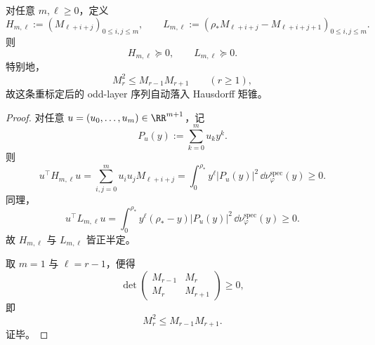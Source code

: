 \begin{corollary}\label{cor:xi-time-part9zbj-shifted-spectral-zeta-hankel-localizing}
对任意 \(m,\ell\ge 0\)，定义
\[
H_{m,\ell}:=(M_{\ell+i+j})_{0\le i,j\le m},
\qquad
L_{m,\ell}:=(\rho_\ast M_{\ell+i+j}-M_{\ell+i+j+1})_{0\le i,j\le m}.
\]
则
\[
H_{m,\ell}\succeq 0,
\qquad
L_{m,\ell}\succeq 0.
\]
特别地，
\[
M_r^2\le M_{r-1}M_{r+1}
\qquad (r\ge 1),
\]
故这条重标定后的 odd-layer 序列自动落入 Hausdorff 矩锥。
\end{corollary}
\begin{proof}
对任意 \(u=(u_0,\dots,u_m)\in\RR^{m+1}\)，记
\[
P_u(y):=\sum_{k=0}^{m}u_k y^k.
\]
则
\[
u^\top H_{m,\ell}u
=
\sum_{i,j=0}^{m}u_i u_j M_{\ell+i+j}
=
\int_0^{\rho_\ast} y^\ell |P_u(y)|^2\,\dd\nu_\varphi^{\mathrm{spec}}(y)\ge 0.
\]
同理，
\[
u^\top L_{m,\ell}u
=
\int_0^{\rho_\ast} y^\ell(\rho_\ast-y)|P_u(y)|^2\,\dd\nu_\varphi^{\mathrm{spec}}(y)\ge 0.
\]
故 \(H_{m,\ell}\) 与 \(L_{m,\ell}\) 皆正半定。

取 \(m=1\) 与 \(\ell=r-1\)，便得
\[
\det
\begin{pmatrix}
M_{r-1} & M_r\\
M_r & M_{r+1}
\end{pmatrix}
\ge 0,
\]
即
\[
M_r^2\le M_{r-1}M_{r+1}.
\]
证毕。
\end{proof}


